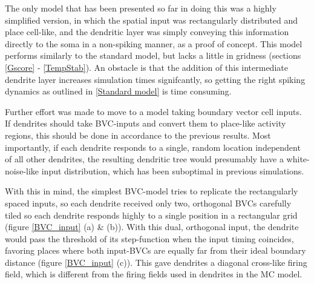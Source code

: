 \documentclass{article}
\begin{document}
    The only model that has been presented so far in doing this was a highly simplified version, in which the spatial input was rectangularly distributed and place cell-like, and the dendritic layer was simply conveying this information directly to the soma in a non-spiking manner, as a proof of concept. This model performs similarly to the standard model, but lacks a little in gridness (sections \ref{Gscore} - \ref{TempStab}). An obstacle is that the addition of this intermediate dendrite layer increases simulation times signifcantly, so getting the right spiking dynamics as outlined in \ref{Standard model} is time consuming.

    Further effort was made to move to a model taking boundary vector cell inputs. If dendrites should take BVC-inputs and convert them to place-like activity regions, this should be done in accordance to the previous results. Most importantly, if each dendrite responds to a single, random location independent of all other dendrites, the resulting dendritic tree would presumably have a white-noise-like input distribution, which has been suboptimal in previous simulations.

    With this in mind, the simplest BVC-model tries to replicate the rectangularly spaced inputs, so each dendrite received only two, orthogonal BVCs carefully tiled so each dendrite responds highly to a single position in a rectangular grid (figure \ref{BVC_input} (a) \& (b)). With this dual, orthogonal input, the dendrite would pass the threshold of its step-function when the input timing coincides, favoring places where both input-BVCs are equally far from their ideal boundary distance (figure \ref{BVC_input} (c)). This gave dendrites a diagonal cross-like firing field, which is different from the firing fields used in dendrites in the MC model.
\end{document}
